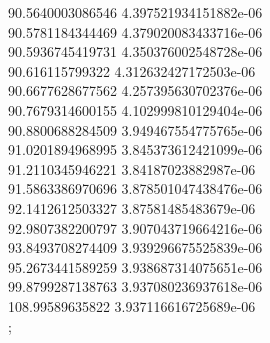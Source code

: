 {90.5640003086546 4.397521934151882e-06 \\
90.5781184344469 4.379020083433716e-06 \\
90.5936745419731 4.350376002548728e-06 \\
90.616115799322 4.312632427172503e-06 \\
90.6677628677562 4.257395630702376e-06 \\
90.7679314600155 4.102999810129404e-06 \\
90.8800688284509 3.949467554775765e-06 \\
91.0201894968995 3.845373612421099e-06 \\
91.2110345946221 3.84187023882987e-06 \\
91.5863386970696 3.878501047438476e-06 \\
92.1412612503327 3.87581485483679e-06 \\
92.9807382200797 3.907043719664216e-06 \\
93.8493708274409 3.939296675525839e-06 \\
95.2673441589259 3.938687314075651e-06 \\
99.8799287138763 3.937080236937618e-06 \\
108.99589635822 3.937116616725689e-06 \\
};
